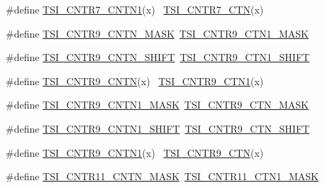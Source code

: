 \begin{DoxyCompactItemize}
\item 
\#define \hyperlink{group___backward___compatibility___symbols_gafb0808552dfe54ed7200c0bd6920e90c}{T\+S\+I\+\_\+\+C\+N\+T\+R7\+\_\+\+C\+N\+T\+N1}(x)                                          ~\hyperlink{group___t_s_i___register___masks_gace78c34d2dc546e0a78bc9cc757b1930}{T\+S\+I\+\_\+\+C\+N\+T\+R7\+\_\+\+C\+TN}(x)
\item 
\#define \hyperlink{group___backward___compatibility___symbols_ga606767240c6f235dd70f977c5159a139}{T\+S\+I\+\_\+\+C\+N\+T\+R9\+\_\+\+C\+N\+T\+N\+\_\+\+M\+A\+SK}~\hyperlink{group___t_s_i___register___masks_gac90318dbf7dc8a739eae6636a7079613}{T\+S\+I\+\_\+\+C\+N\+T\+R9\+\_\+\+C\+T\+N1\+\_\+\+M\+A\+SK}
\item 
\#define \hyperlink{group___backward___compatibility___symbols_gaff005023621cb78239e344395b4b5925}{T\+S\+I\+\_\+\+C\+N\+T\+R9\+\_\+\+C\+N\+T\+N\+\_\+\+S\+H\+I\+FT}~\hyperlink{group___t_s_i___register___masks_ga22e9b412d3df505c3f1283d700c5a192}{T\+S\+I\+\_\+\+C\+N\+T\+R9\+\_\+\+C\+T\+N1\+\_\+\+S\+H\+I\+FT}
\item 
\#define \hyperlink{group___backward___compatibility___symbols_gaeede23b638e9b14f8ed9af70171de056}{T\+S\+I\+\_\+\+C\+N\+T\+R9\+\_\+\+C\+N\+TN}(x)                                            ~\hyperlink{group___t_s_i___register___masks_ga4f5647846911939a0e7a8eb185a01913}{T\+S\+I\+\_\+\+C\+N\+T\+R9\+\_\+\+C\+T\+N1}(x)
\item 
\#define \hyperlink{group___backward___compatibility___symbols_ga4beb2ac7fbf0f1664b2369c399e900af}{T\+S\+I\+\_\+\+C\+N\+T\+R9\+\_\+\+C\+N\+T\+N1\+\_\+\+M\+A\+SK}~\hyperlink{group___t_s_i___register___masks_ga0df38f853064b362e6ecf50598304b7c}{T\+S\+I\+\_\+\+C\+N\+T\+R9\+\_\+\+C\+T\+N\+\_\+\+M\+A\+SK}
\item 
\#define \hyperlink{group___backward___compatibility___symbols_gad507b4ce5e4919c95c6a411bf21e73e7}{T\+S\+I\+\_\+\+C\+N\+T\+R9\+\_\+\+C\+N\+T\+N1\+\_\+\+S\+H\+I\+FT}~\hyperlink{group___t_s_i___register___masks_ga209e7bab4fc4a6490bd7e64741d0e5c8}{T\+S\+I\+\_\+\+C\+N\+T\+R9\+\_\+\+C\+T\+N\+\_\+\+S\+H\+I\+FT}
\item 
\#define \hyperlink{group___backward___compatibility___symbols_gaa72bf0f62f829400fd61c63b80dbdbda}{T\+S\+I\+\_\+\+C\+N\+T\+R9\+\_\+\+C\+N\+T\+N1}(x)                                          ~\hyperlink{group___t_s_i___register___masks_ga97a9615523f7d4d083f0327a62603ebd}{T\+S\+I\+\_\+\+C\+N\+T\+R9\+\_\+\+C\+TN}(x)
\item 
\#define \hyperlink{group___backward___compatibility___symbols_gab3ee5d8edde9866c09430d870ff6516a}{T\+S\+I\+\_\+\+C\+N\+T\+R11\+\_\+\+C\+N\+T\+N\+\_\+\+M\+A\+SK}~\hyperlink{group___t_s_i___register___masks_ga20e6e5cb203746144a70994cf2b686ef}{T\+S\+I\+\_\+\+C\+N\+T\+R11\+\_\+\+C\+T\+N1\+\_\+\+M\+A\+SK}

\end{DoxyCompactItemize}
